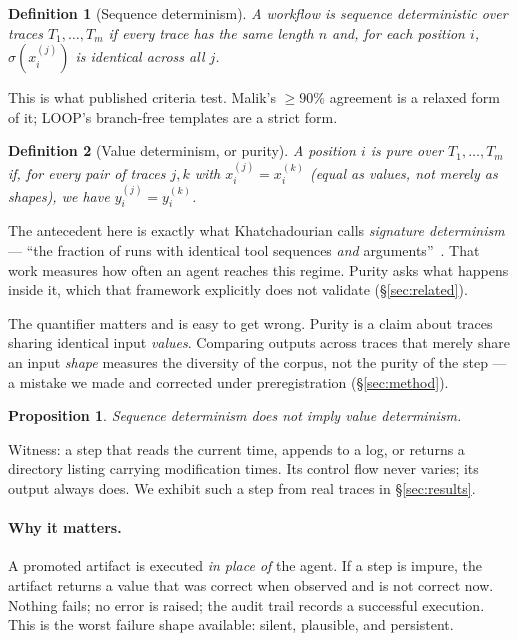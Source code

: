 \documentclass[10pt,conference]{article}
\newtheorem{definition}{Definition}
\newtheorem{proposition}{Proposition}
\begin{document}
\begin{definition}[Sequence determinism]
A workflow is \emph{sequence deterministic} over traces
$T_1,\dots,T_m$ if every trace has the same length $n$ and, for each position
$i$, $\sigma(x_i^{(j)})$ is identical across all $j$.
\end{definition}

This is what published criteria test. Malik's $\geq 90\%$ agreement is a relaxed
form of it; LOOP's branch-free templates are a strict form.

\begin{definition}[Value determinism, or purity]
A position $i$ is \emph{pure} over $T_1,\dots,T_m$ if, for every pair of traces
$j, k$ with $x_i^{(j)} = x_i^{(k)}$ (equal as values, not merely as shapes), we
have $y_i^{(j)} = y_i^{(k)}$.
\end{definition}

The antecedent here is exactly what Khatchadourian calls \emph{signature
determinism} --- ``the fraction of runs with identical tool sequences
\emph{and} arguments''~\cite{dfah2026}. That work measures how often an agent
reaches this regime. Purity asks what happens inside it, which that framework
explicitly does not validate (\S\ref{sec:related}).

The quantifier matters and is easy to get wrong. Purity is a claim about traces
sharing identical input \emph{values}. Comparing outputs across traces that
merely share an input \emph{shape} measures the diversity of the corpus, not the
purity of the step --- a mistake we made and corrected under preregistration
(\S\ref{sec:method}).

\begin{proposition}
Sequence determinism does not imply value determinism.
\end{proposition}

\noindent Witness: a step that reads the current time, appends to a log, or
returns a directory listing carrying modification times. Its control flow never
varies; its output always does. We exhibit such a step from real traces in
\S\ref{sec:results}.

\paragraph{Why it matters.} A promoted artifact is executed \emph{in place of}
the agent. If a step is impure, the artifact returns a value that was correct
when observed and is not correct now. Nothing fails; no error is raised; the
audit trail records a successful execution. This is the worst failure shape
available: silent, plausible, and persistent.
\end{document}
